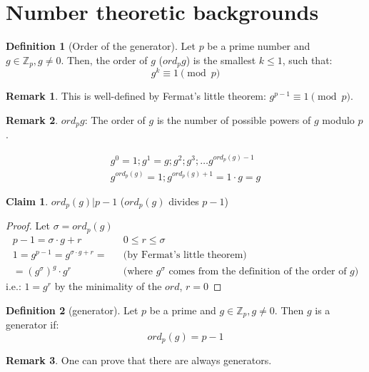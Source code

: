 \documentclass[11pt]{article}
\theoremstyle{definition}
\newtheorem{definition}{Definition}[section]
\newtheorem{claim}{Claim}[section]
\newtheorem{remark}{Remark}[section]
\theoremstyle{proof}
\begin{document}
	\section{Number theoretic backgrounds}
	
	\begin{definition}[Order of the generator]
		Let $p$ be a prime number and $g \in \mathbb{Z}_p, g \ne 0$. Then, the order of $g$ ($ord_p g$) is the smallest $k \le 1$, such that:
		$$
		g^k \equiv 1 \pmod{p}
		$$
	\end{definition}
	
	\begin{remark}
		This is well-defined by Fermat's little theorem: $g^{p-1} \equiv 1 \pmod{p}$.
	\end{remark}
	
	\begin{remark}
		$ord_p g$: The order of $g$ is the number of possible powers of $g$ modulo $p$.
	\end{remark}
	
	\begin{align}
		g^0 = 1;g^1 = g; g^2; g^3; \dots g^{ord_p(g)-1} \\
		g^{ord_p(g)} = 1; g^{ord_p(g)+1} = 1 \cdot g = g 
	\end{align}
	
	\begin{claim}
		$ord_p(g) | p-1$ ($ord_p(g)$ divides $p-1$)
	\end{claim}
	\begin{proof}
		Let $\sigma = ord_p (g)$
		\begin{align}
			p-1 = \sigma \cdot g + r && 0 \le r \le \sigma \\
			1 = g^{p-1} = g^{\sigma \cdot g + r} = && \text{(by Fermat's little theorem)} \\
			= (g^{\sigma})^g \cdot g^r && \text{(where $g^\sigma$ comes from the definition of the order of $g$)}
		\end{align}
		i.e.: $1=g^r$ by the minimality of the $ord$, $r=0$
	\end{proof}
	
	\begin{definition}[generator]
		Let $p$ be a prime and $g \in \mathbb{Z}_p, g \ne 0$. Then $g$ is a generator if:
		$$
		ord_p(g) = p-1
		$$
	\end{definition}
	
	\begin{remark}
		One can prove that there are always generators.
	\end{remark}
	
\end{document}
